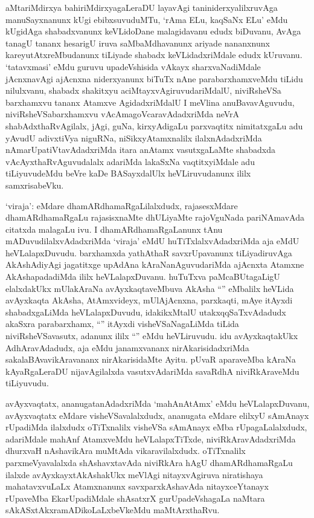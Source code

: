 \begin{artha}
aMtariMdirxya bahiriMdirxyagaLeraDU layavAgi taniniderxyalilxruvAga manuSayxnanunx kUgi ebibxsuvuduMTu, `rAma ELu, kaqSaNx ELu' eMdu kUgidAga shabadxvanunx keVLidoDane malagidavanu edudx biDuvanu, AvAga tanagU tananx hesarigU iruva saMbaMdhavanunx ariyade nananxnunx kareyutAtxreMbudanunx tiLiyade shabadx keVLidadxriMdale edudx kUruvanu. `tatavxmasi' eMdu guruvu upadeVshisida vAkayx sharxvaNadiMdale jAcnxnavAgi ajAcnxna niderxyanunx biTuTx nAne parabarxhamxveMdu tiLidu nilulxvanu, shabadx shakitxyu aciMtayxvAgiruvudariMdalU, niviRsheVSa barxhamxvu tananx Atamxve AgidadxriMdalU I meVlina anuBavavAguvudu, niviRsheVSabarxhamxvu vAcAmagoVcaravAdadxriMda neVrA shabAdxthaRvAgilalx, jAgi, guNa, kirxyAdigaLu parxvaqtitx nimitatxgaLu adu yAvudU adivxtiVya niguRNa, niSikxyAtamxnalilx ilalxnAdadxriMda nAmarUpatiVtavAdadxriMda itara anAtamx vasutxgaLaMte shabadxda vAcAyxthaRvAguvudalalx adariMda lakaSxNa vaqtitxyiMdale adu tiLiyuvudeMdu beVre kaDe BASayxdalUlx heVLiruvudanunx ililx samxrisabeVku. 

`viraja': eMdare dhamARdhamaRgaLilalxdudx, rajasesxMdare dhamARdhamaRgaLu rajasisxnaMte dhULiyaMte rajoVguNada pariNAmavAda citatxda malagaLu ivu. I dhamARdhamaRgaLanunx tAnu mADuvudilalxvAdadxriMda `viraja' eMdU huTiTxlalxvAdadxriMda aja eMdU heVLalapxDuvudu. barxhamxda yathAthaR savxrUpavanunx tiLiyadiruvAga AkAshAdiyAgi jagatitxge upAdAna kAraNanAguvudariMda ajAcnxta Atamxne AkAshapadadiMda ililx heVLalapxDuvanu. huTuTxva paMcaBUtagaLigU elalxdakUkx mUlakAraNa avAyxkaqtaveMbuva AkAsha ``\stext'' eMbalilx heVLida avAyxkaqta AkAsha, AtAmxvideyx, mUlAjAcnxna, parxkaqti, mAye itAyxdi shabadxgaLiMda heVLalapxDuvudu, idakikxMtalU utakxqqSaTxvAdadudx akaSxra parabarxhamx, ``\stext'' itAyxdi visheVSaNagaLiMda tiLida niviRsheVSavasutx, adanunx ililx ``\stext'' eMdu heVLiruvudu. idu avAyxkaqtakUkx AdhAravAdadudx, aja eMdu janamxvananx nirAkarisidadxriMda sakalaBAvavikAravananx nirAkarisidaMte Ayitu. pUvaR aparaveMba kAraNa kAyaRgaLeraDU nijavAgilalxda vasutxvAdariMda savaRdhA niviRkAraveMdu tiLiyuvudu.

avAyxvaqtatx, ananugatanAdadxriMda `mahAnAtAmx' eMdu heVLalapxDuvanu, avAyxvaqtatx eMdare visheVSavalalxdudx, ananugata eMdare elilxyU sAmAnayx rUpadiMda ilalxdudx oTiTxnalilx visheVSa sAmAnayx eMba rUpagaLalalxdudx, adariMdale mahAnf AtamxveMdu heVLalapxTiTxde, niviRkAravAdadxriMda dhurxvaH nAshavikAra muMtAda vikaravilalxdudx. oTiTxnalilx parxmeVyavalalxda shAshavxtavAda niviRkAra hAgU dhamARdhamaRgaLu ilalxde avAyxkayxtAkAshakUkx meVlAgi nitayxvAgiruva niratishaya mahatavxvuLaLx Atamxnanunx savxparxkAshavAda nitayxceYtanayx rUpaveMba EkarUpadiMdale shAsatxrX gurUpadeVshagaLa naMtara sAkASxtAkxramADikoLaLxbeVkeMdu maMtArxthaRvu.
\end{artha}

